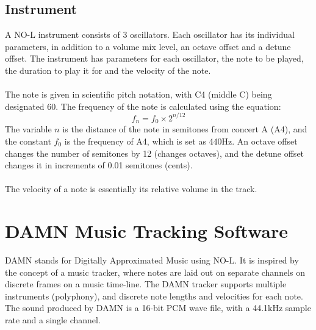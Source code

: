\documentclass[11pt]{article}
\begin{document}
\subsection{Instrument}
A NO-L instrument consists of 3 oscillators. Each oscillator has its individual parameters, in addition to a volume mix level, an octave offset and a detune offset. The instrument has parameters for each oscillator, the note to be played, the duration to play it for and the velocity of the note.
\\\\
The note is given in scientific pitch notation, with C4 (middle C) being designated 60. The frequency of the note is calculated using the equation: 
\[f_n=f_0\times 2^{n/12}\]
The variable \(n\) is the distance of the note in semitones from concert A (A4), and the constant \(f_0\) is the frequency of A4, which is set as 440Hz. An octave offset changes the number of semitones by 12 (changes octaves), and the detune offset changes it in increments of 0.01 semitones (cents).\\\\
The velocity of a note is essentially its relative volume in the track.

\section{DAMN Music Tracking Software}
DAMN stands for Digitally Approximated Music using NO-L. It is inspired by the concept of a music tracker, where notes are laid out on separate channels on discrete frames on a music time-line. The DAMN tracker supports multiple instruments (polyphony), and discrete note lengths and velocities for each note. The sound produced by DAMN is a 16-bit PCM wave file, with a 44.1kHz sample rate and a single channel.
\end{document}
